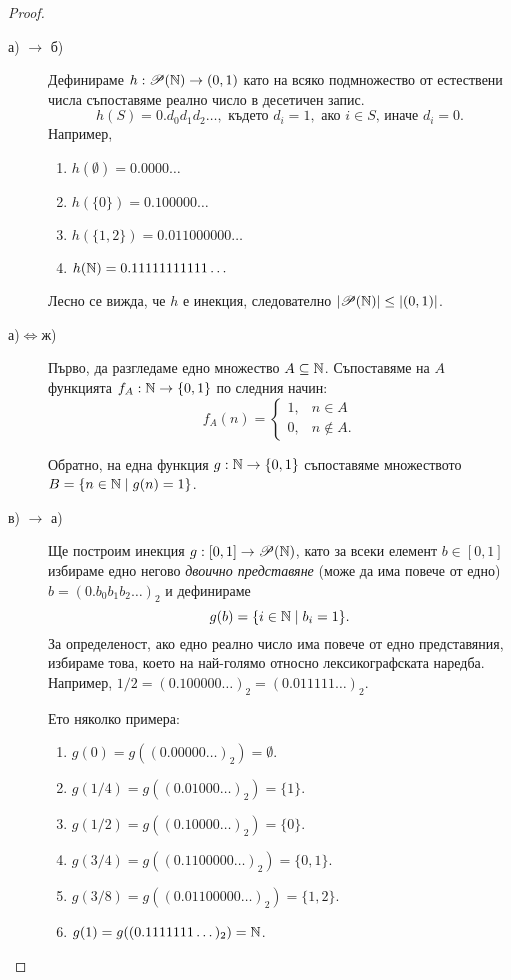 \begin{proof}
  \begin{description}
  \item[а) $\rightarrow$ б)]
    Дефинираме $h:\mathscr{P}(\mathbb{N})\to (0,1)$ като на всяко подмножество от естествени числа съпоставяме реално число в десетичен запис.
    \[h(S) = 0.d_0d_1d_2\dots,\mbox{ където } d_i = 1,\mbox{ ако }i\in S\mbox{, иначе } d_i = 0.\]
    Например,
    \begin{enumerate}[]
    \item
      $h(\emptyset) = 0.0000\dots$
    \item
      $h(\{0\}) = 0.100000\dots$
    \item
      $h(\{1,2\}) = 0.011000000\dots$
    \item
      $h(\mathbb{N}) = 0.11111111111\dots$
    \end{enumerate}
    Лесно се вижда, че $h$ е инекция, следователно $|\mathscr{P}(\mathbb{N})|\leq|(0,1)|$.
  \item[а)$\iff$ж)]
    Първо, да разгледаме едно множество $A \subseteq \mathbb{N}$.
    Съпоставяме на $A$ функцията $f_A:\mathbb{N} \to \{0,1\}$  по следния начин:
    \[
    f_A(n) = 
    \begin{cases}
      1, & n \in A\\
      0, & n\not\in A.
    \end{cases}
    \]

    Обратно, на една функция $g:\mathbb{N}\to\{0,1\}$ съпоставяме множеството $B = \{n \in \mathbb{N} \mid g(n) = 1\}$.
  \item[в) $\rightarrow$ а)]
    Ще построим инекция $g:[0,1]\to\mathscr{P}(\mathbb{N})$, като
    за всеки елемент $b\in[0,1]$ избираме едно негово {\em двоично представяне} (може да има повече от едно)
    $b = (0.b_0b_1b_2\dots)_2$ и дефинираме \[g(b) = \{i\in\mathbb{N}\mid b_i = 1\}.\]
    За определеност, ако едно реално число има повече от едно представяния, избираме това, което на най-голямо относно лексикографската наредба.
    Например, $1/2 = (0.100000\dots)_2 = (0.011111\dots)_2$.

    Ето няколко примера:
    \begin{enumerate}[]
    \item
      $g(0) = g((0.00000\dots)_2) = \emptyset$.
    \item
      $g(1/4) = g((0.01000\dots)_2) = \{1\}$.
    \item
      $g(1/2) = g((0.10000\dots)_2) = \{0\}$.
    \item
      $g(3/4) = g((0.1100000\dots)_2) = \{0,1\}$.
    \item
      $g(3/8) = g((0.01100000\dots)_2) = \{1,2\}$.
    \item
      $g(1) = g((0.1111111\dots)_2) = \mathbb{N}$.
    \end{enumerate}
    

\end{description}
\end{proof}

